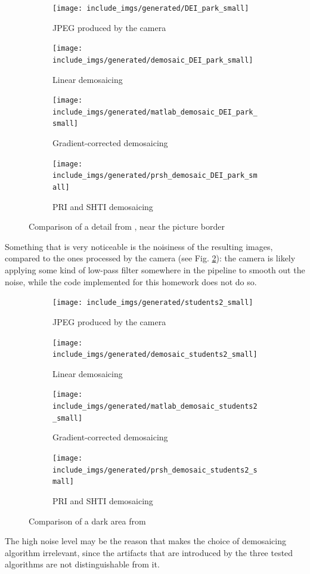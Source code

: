 \documentclass[a4paper,oneside]{article}
\begin{document}
\begin{figure}[htbp]
  \centering
  \begin{subfigure}{.4\textwidth}
    \centering
    \texttt{[image: include\_imgs/generated/DEI\_park\_small]}
    \caption{JPEG produced by the camera}
  \end{subfigure}%
  \begin{subfigure}{.4\textwidth}
    \centering
    \texttt{[image: include\_imgs/generated/demosaic\_DEI\_park\_small]}
    \caption{Linear demosaicing}
  \end{subfigure}
  \begin{subfigure}{.4\textwidth}
    \centering
    \texttt{[image: include\_imgs/generated/matlab\_demosaic\_DEI\_park\_small]}
    \caption{Gradient-corrected demosaicing}
  \end{subfigure}%
  \begin{subfigure}{.4\textwidth}
    \centering
    \texttt{[image: include\_imgs/generated/prsh\_demosaic\_DEI\_park\_small]}
    \caption{PRI and SHTI demosaicing}
  \end{subfigure}
  \caption{Comparison of a detail from , near
    the picture border}
  \label{fig:park}
\end{figure}
Something that is very noticeable is the noisiness of the resulting
images, compared to the ones processed by the camera (see
Fig. \ref{fig:students}): the camera is likely applying some kind of
low-pass filter somewhere in the pipeline to smooth out the noise,
while the code implemented for this homework does not do so.
\begin{figure}[htbp]
  \centering
  \begin{subfigure}{.4\textwidth}
    \centering
    \texttt{[image: include\_imgs/generated/students2\_small]}
    \caption{JPEG produced by the camera}
  \end{subfigure}%
  \begin{subfigure}{.4\textwidth}
    \centering
    \texttt{[image: include\_imgs/generated/demosaic\_students2\_small]}
    \caption{Linear demosaicing}
  \end{subfigure}
  \begin{subfigure}{.4\textwidth}
    \centering
    \texttt{[image: include\_imgs/generated/matlab\_demosaic\_students2\_small]}
    \caption{Gradient-corrected demosaicing}
  \end{subfigure}%
  \begin{subfigure}{.4\textwidth}
    \centering
    \texttt{[image: include\_imgs/generated/prsh\_demosaic\_students2\_small]}
    \caption{PRI and SHTI demosaicing}
  \end{subfigure}
  \caption{Comparison of a dark area from }
  \label{fig:students}
\end{figure}
The high noise level may be the reason that makes the choice of
demosaicing algorithm irrelevant, since the artifacts that are
introduced by the three tested algorithms are not distinguishable
from it.

\printbibliography
\end{document}
